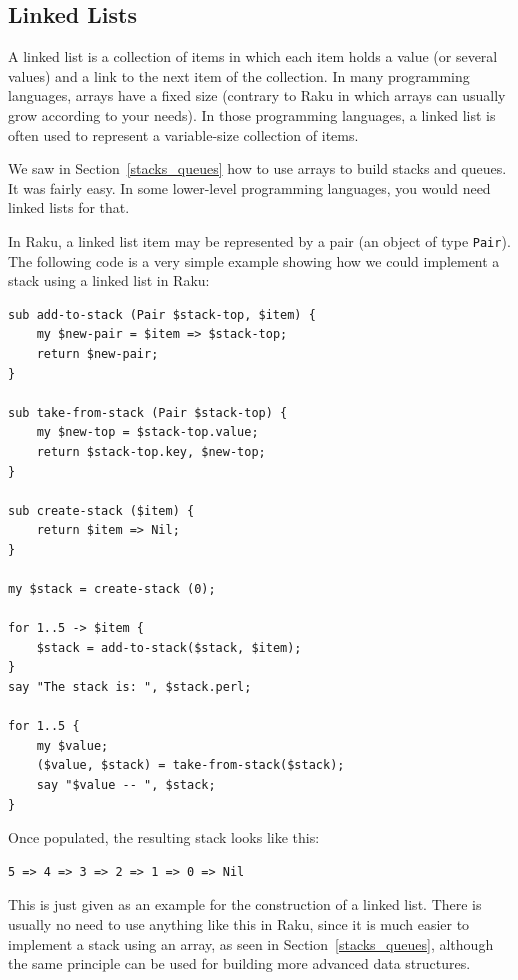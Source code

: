 \subsection{Linked Lists}
\label{linked_list}

A linked list is a collection of items in which each item holds 
a value (or several values) and a link to the next item of the 
collection. In many programming languages, arrays have a fixed 
size (contrary to Raku in which arrays can usually grow according to 
your needs). In those programming languages, a linked list 
is often used to represent a variable-size collection of items.

We saw in Section~\ref{stacks_queues} how to use arrays 
to build stacks and queues. It was fairly easy. In some 
lower-level programming languages, you would need linked 
lists for that.

In Raku, a linked list item may be represented by a pair 
(an object of type \verb'Pair'). The 
following code is a very simple example showing how 
we could implement a stack using a linked list in Raku:

\begin{verbatim}
sub add-to-stack (Pair $stack-top, $item) {
    my $new-pair = $item => $stack-top;
    return $new-pair;
}

sub take-from-stack (Pair $stack-top) {
    my $new-top = $stack-top.value;
    return $stack-top.key, $new-top;
}

sub create-stack ($item) {
    return $item => Nil;
}

my $stack = create-stack (0);

for 1..5 -> $item {
    $stack = add-to-stack($stack, $item);
}
say "The stack is: ", $stack.perl;

for 1..5 {
    my $value;
    ($value, $stack) = take-from-stack($stack);
    say "$value -- ", $stack;    
}
\end{verbatim}

Once populated, the resulting stack looks like this:

\begin{verbatim}
5 => 4 => 3 => 2 => 1 => 0 => Nil
\end{verbatim}

This is just given as an example for the construction of a 
linked list. There is usually no need to use anything like 
this in Raku, since it is much easier to implement 
a stack using an array, as seen in Section~\ref{stacks_queues}, 
although the same principle can be used for building more 
advanced data structures.

